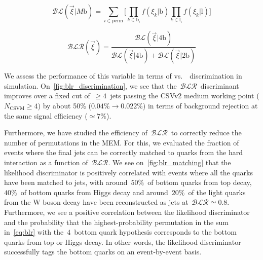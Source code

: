 \begin{equation}
\label{eq:blr}
\mathcal{BL}(\vec{\xi} | M\mathrm{b}) = \sum_{i \in \mathrm{perm}} \biggl[ \prod_{k \in \mathrm{b}_i} f(\xi_k | \mathrm{b}) \prod_{k \in \mathrm{l}_i} f(\xi_k | \mathrm{l}) \biggr]
\end{equation}

\begin{equation}
\label{eq:blr_ratio}
\mathcal{BLR}(\vec{\xi}) = \frac{\mathcal{BL}(\vec{\xi} | 4\mathrm{b})}{\mathcal{BL}(\vec{\xi} | 4\mathrm{b}) + \mathcal{BL}(\vec{\xi} | 2\mathrm{b})}
\end{equation}

We assess the performance of this variable in terms of \ttHbb vs.~\ttlf~discrimination in simulation. On~\cref{fig:blr_discrimination}, we see that the~$\mathcal{BLR}$~discriminant improves over a fixed cut of~$\ge4$~jets passing the CSVv2 medium working point ($N_{\mathrm{CSVM}} \ge 4$) by about 50\% ($0.04\% \rightarrow 0.022\%$) in terms of background rejection at the same signal efficiency ($\simeq 7\%$).

Furthermore, we have studied the efficiency of~$\mathcal{BLR}$~to correctly reduce the number of permutations in the MEM. For this, we evaluated the fraction of events where the final jets can be correctly matched to quarks from the hard interaction as a function of~$\mathcal{BLR}$. We see on~\cref{fig:blr_matching} that the likelihood discriminator is positively correlated with events where all the quarks have been matched to jets, with around~$50\%$~of bottom quarks from top decay, $40\%$~of bottom quarks from Higgs decay and around~$20\%$~of the light quarks from the W boson decay have been reconstructed as jets at~$\mathcal{BLR} \simeq 0.8$. Furthermore, we see a positive correlation between the likelihood discriminator and the probability that the highest-probability permutation in the sum in~\cref{eq:blr} with the~$4$~bottom quark hypothesis corresponds to the bottom quarks from top or Higgs decay. In other words, the likelihood discriminator successfully tags the bottom quarks on an event-by-event basis.

